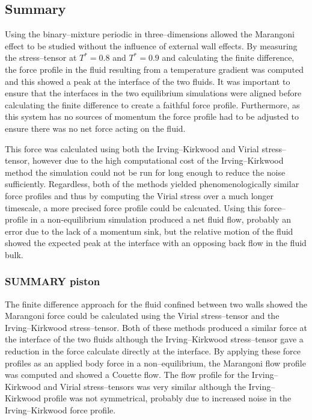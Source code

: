 \subsection{Summary}
Using the binary--mixture periodic in three--dimensions allowed the Marangoni effect to be studied without the influence of external wall effects.
By measuring the stress--tensor at $T^{*}=0.8$ and $T^{*}=0.9$ and calculating the finite difference, the force profile in the fluid resulting from a temperature gradient was computed and this showed a peak at the interface of the two fluids.
It was important to ensure that the interfaces in the two equilibrium simulations were aligned before calculating the finite difference to create a faithful force profile.
Furthermore, as this system has no sources of momentum the force profile had to be adjusted to ensure there was no net force acting on the fluid.

This force was calculated using both the Irving--Kirkwood and Virial stress--tensor, however due to the high computational cost of the Irving--Kirkwood method the simulation could not be run for long enough to reduce the noise sufficiently.
Regardless, both of the methods yielded phenomenologically similar force profiles and thus by computing the Virial stress over a much longer timescale, a more precised force profile could be calcuated.
Using this force--profile in a non-equilibrium simulation produced a net fluid flow, probably an error due to the lack of a momentum sink, but the relative motion of the fluid showed the expected peak at the interface with an opposing back flow in the fluid bulk.


\subsubsection{SUMMARY piston}
The finite difference approach for the fluid confined between two walls showed the Marangoni force could be calculated using the Virial stress--tensor and the Irving--Kirkwood stress--tensor.
Both of these methods produced a similar force at the interface of the two fluids although the Irving--Kirkwood stress--tensor gave a reduction in the force calculate directly at the interface.
By applying these force profiles as an applied body force in a non--equilibrium, the Marangoni flow profile was computed and showed a Couette flow.
The flow profile for the Irving--Kirkwood and Virial stress--tensors was very similar although the Irving--Kirkwood profile was not symmetrical, probably due to increased noise in the Irving--Kirkwood force profile.


